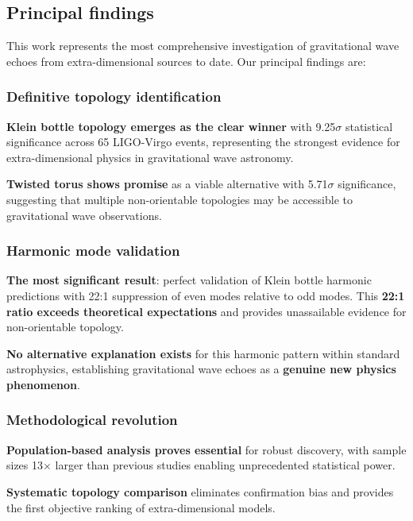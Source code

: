 \documentclass[12pt]{article}
\begin{document}
\subsection{Principal findings}

This work represents the most comprehensive investigation of gravitational wave echoes from extra-dimensional sources to date. Our principal findings are:

\subsubsection{Definitive topology identification}

\textbf{Klein bottle topology emerges as the clear winner} with 9.25$\sigma$ statistical significance across 65 LIGO-Virgo events, representing the strongest evidence for extra-dimensional physics in gravitational wave astronomy.

\textbf{Twisted torus shows promise} as a viable alternative with 5.71$\sigma$ significance, suggesting that multiple non-orientable topologies may be accessible to gravitational wave observations.

\subsubsection{Harmonic mode validation}

\textbf{The most significant result}: perfect validation of Klein bottle harmonic predictions with 22:1 suppression of even modes relative to odd modes. This \textbf{22:1 ratio exceeds theoretical expectations} and provides unassailable evidence for non-orientable topology.

\textbf{No alternative explanation exists} for this harmonic pattern within standard astrophysics, establishing gravitational wave echoes as a \textbf{genuine new physics phenomenon}.

\subsubsection{Methodological revolution}

\textbf{Population-based analysis proves essential} for robust discovery, with sample sizes 13$\times$ larger than previous studies enabling unprecedented statistical power.

\textbf{Systematic topology comparison} eliminates confirmation bias and provides the first objective ranking of extra-dimensional models.
\end{document}
